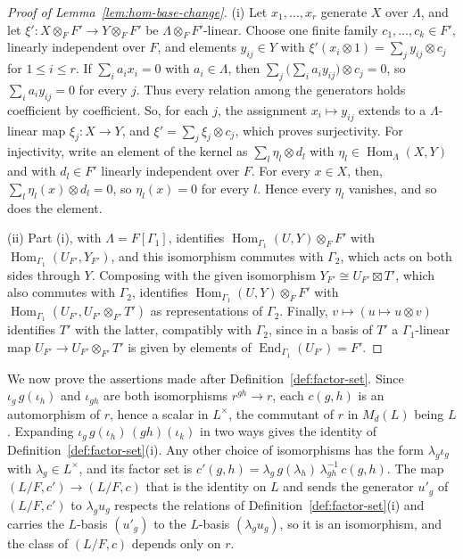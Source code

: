 \documentclass[a4paper,11pt]{amsart}
\theoremstyle{definition}
\theoremstyle{remark}
\numberwithin{equation}{section}
\DeclareMathOperator{\End}{End}
\DeclareMathOperator{\Hom}{Hom}
\begin{document}
\begin{proof}[Proof of Lemma~\ref{lem:hom-base-change}]
(i) Let $x_1,\dots,x_r$ generate $X$ over $\Lambda$, and let $\xi'\colon X\otimes_FF'\to Y\otimes_FF'$ be $\Lambda\otimes_FF'$-linear. Choose one finite family $c_1,\dots,c_k\in F'$, linearly independent over $F$, and elements $y_{ij}\in Y$ with $\xi'(x_i\otimes1)=\sum_jy_{ij}\otimes c_j$ for $1\le i\le r$. If $\sum_ia_ix_i=0$ with $a_i\in\Lambda$, then $\sum_j\bigl(\sum_ia_iy_{ij}\bigr)\otimes c_j=0$, so $\sum_ia_iy_{ij}=0$ for every $j$. Thus every relation among the generators holds coefficient by coefficient. So, for each $j$, the assignment $x_i\mapsto y_{ij}$ extends to a $\Lambda$-linear map $\xi_j\colon X\to Y$, and $\xi'=\sum_j\xi_j\otimes c_j$, which proves surjectivity. For injectivity, write an element of the kernel as $\sum_l\eta_l\otimes d_l$ with $\eta_l\in\Hom_\Lambda(X,Y)$ and with $d_l\in F'$ linearly independent over $F$. For every $x\in X$, then, $\sum_l\eta_l(x)\otimes d_l=0$, so $\eta_l(x)=0$ for every $l$. Hence every $\eta_l$ vanishes, and so does the element.

(ii) Part (i), with $\Lambda=F[\Gamma_1]$, identifies $\Hom_{\Gamma_1}(U,Y)\otimes_FF'$ with $\Hom_{\Gamma_1}(U_{F'},Y_{F'})$, and this isomorphism commutes with $\Gamma_2$, which acts on both sides through $Y$. Composing with the given isomorphism $Y_{F'}\cong U_{F'}\boxtimes T'$, which also commutes with $\Gamma_2$, identifies $\Hom_{\Gamma_1}(U,Y)\otimes_FF'$ with $\Hom_{\Gamma_1}(U_{F'},U_{F'}\otimes_{F'}T')$ as representations of $\Gamma_2$. Finally, $v\mapsto(u\mapsto u\otimes v)$ identifies $T'$ with the latter, compatibly with $\Gamma_2$, since in a basis of $T'$ a $\Gamma_1$-linear map $U_{F'}\to U_{F'}\otimes_{F'}T'$ is given by elements of $\End_{\Gamma_1}(U_{F'})=F'$.
\end{proof}

We now prove the assertions made after Definition~\ref{def:factor-set}. Since $\iota_g\,g(\iota_h)$ and $\iota_{gh}$ are both isomorphisms $r^{gh}\to r$, each $c(g,h)$ is an automorphism of $r$, hence a scalar in $L^\times$, the commutant of $r$ in $M_d(L)$ being $L$. Expanding $\iota_g\,g(\iota_h)\,(gh)(\iota_k)$ in two ways gives the identity of Definition~\ref{def:factor-set}(i). Any other choice of isomorphisms has the form $\lambda_g\iota_g$ with $\lambda_g\in L^\times$, and its factor set is $c'(g,h)=\lambda_g\,g(\lambda_h)\,\lambda_{gh}^{-1}\,c(g,h)$. The map $(L/F,c')\to(L/F,c)$ that is the identity on $L$ and sends the generator $u'_g$ of $(L/F,c')$ to $\lambda_gu_g$ respects the relations of Definition~\ref{def:factor-set}(i) and carries the $L$-basis $(u'_g)$ to the $L$-basis $(\lambda_gu_g)$, so it is an isomorphism, and the class of $(L/F,c)$ depends only on $r$.
\end{document}
